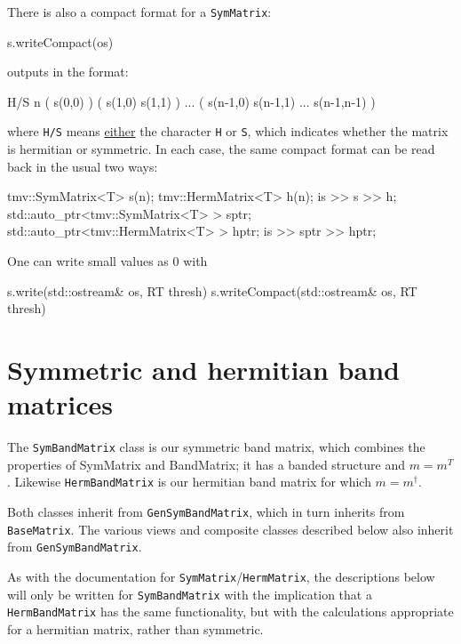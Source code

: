 \documentclass[twoside,letterpaper,11pt]{article}
\renewcommand{\tt}[1]{{\lstinline {#1}}}
\begin{document}
There is also a compact format for a \tt{SymMatrix}:
\begin{tmvcode}
s.writeCompact(os)
\end{tmvcode}
outputs in the format:
\begin{tmvcode}
H/S n 
( s(0,0) )
( s(1,0)  s(1,1) )
...
( s(n-1,0)  s(n-1,1) ... s(n-1,n-1) )
\end{tmvcode}
where \tt{H/S} means \underline{either} the character \tt{H} or \tt{S}, which indicates whether 
the matrix is hermitian or symmetric.
In each case, the same compact format can be read back in the usual two ways:
\begin{tmvcode}
tmv::SymMatrix<T> s(n);
tmv::HermMatrix<T> h(n);
is >> s >> h;
std::auto_ptr<tmv::SymMatrix<T> > sptr;
std::auto_ptr<tmv::HermMatrix<T> > hptr;
is >> sptr >> hptr;
\end{tmvcode}
One can write small values as 0 with
\begin{tmvcode}
s.write(std::ostream& os, RT thresh)
s.writeCompact(std::ostream& os, RT thresh)
\end{tmvcode}

\newpage
\section{Symmetric and hermitian band matrices}
\label{SymBandMatrix}

The \tt{SymBandMatrix} class is our symmetric band matrix, which combines
the properties of SymMatrix and BandMatrix; it has a banded structure and
$m = m^T$.  Likewise \tt{HermBandMatrix} is our hermitian band matrix for
which $m = m^\dagger$.

Both classes inherit from \tt{GenSymBandMatrix}, which in turn inherits from 
\tt{BaseMatrix}.  The various views and composite classes described below 
also inherit from \tt{GenSymBandMatrix}.

As with the documentation for \tt{SymMatrix}/\tt{HermMatrix}, the descriptions
below will only be written for \tt{SymBandMatrix} with the implication
that a \tt{HermBandMatrix} has the same functionality, but with the calculations
appropriate for a hermitian matrix, rather than symmetric.
\end{document}
